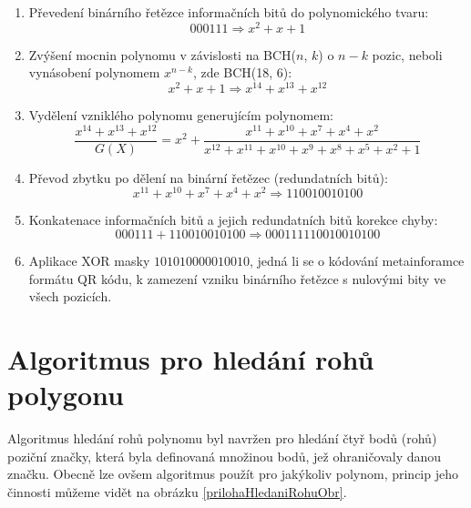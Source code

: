 \begin{enumerate}
  \item Převedení binárního řetězce informačních bitů do polynomického tvaru:
	\begin{equation}
	  000111 \Rightarrow x^2 + x + 1
	\end{equation}
  \item Zvýšení mocnin polynomu v závislosti na BCH($n$, $k$) o $n - k$ pozic,
  neboli vynásobení polynomem $x^{n-k}$, zde BCH(18, 6):
	\begin{equation}
	  x^2 + x + 1 \Rightarrow x^{14} + x^{13} + x^{12}
	\end{equation}
  \item Vydělení vzniklého polynomu generujícím polynomem:
	\begin{equation}
	  \frac{x^{14} + x^{13} + x^{12}}{G(X)} =  x^2 + \frac{x^{11} + x^{10} + x^7 +
	  x^4 +x^2}{x^{12} + x^{11} + x^{10} + x^9 + x^8 + x^5 + x^2 + 1}
	\end{equation}
  \item Převod zbytku po dělení na binární řetězec (redundatních bitů):
	\begin{equation}
      x^{11} + x^{10} + x^7 + x^4 +x^2 \Rightarrow 110010010100
	\end{equation}
  \item Konkatenace informačních bitů a jejich redundatních bitů korekce chyby:
	\begin{equation}
      000111 + 110010010100 \Rightarrow 000111110010010100
	\end{equation}
  \item Aplikace XOR masky $101010000010010$, jedná li se o kódování
  metainforamce formátu QR kódu, k zamezení vzniku binárního řetězce s
  nulovými bity ve všech pozicích.
\end{enumerate}

\chapter{Algoritmus pro hledání rohů polygonu}
\label{algoritmusHledaniRohu}

Algoritmus hledání rohů polynomu byl navržen pro hledání čtyř bodů (rohů)
poziční značky, která byla definovaná množinou bodů, jež ohraničovaly danou
značku. Obecně lze ovšem algoritmus použít pro jakýkoliv polynom, princip jeho
činnosti můžeme vidět na obrázku \ref{prilohaHledaniRohuObr}.


